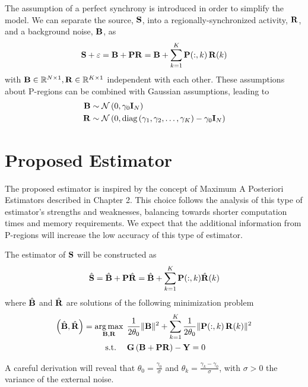 The assumption of a perfect synchrony is introduced in order to simplify the model.
%
We can separate the source, $\mathbf{S}$, into a regionally-synchronized activity, $\mathbf{R}$, and a background noise, $\mathbf{B}$, as
\begin{equation}
    \mathbf{S} +\varepsilon = \mathbf{B} + \mathbf{P} \mathbf{R} = \mathbf{B} + \sum_{k=1}^K \mathbf{P}(:,k)\, \mathbf{R}(k)
    \label{eq:3.4}
\end{equation}
with $\mathbf{B} \in \mathbb{R}^{N\times 1}, \mathbf{R} \in \mathbb{R}^{K\times 1}$ independent with each other.
%
These assumptions about P-regions can be combined with Gaussian assumptions, leading to 
\begin{align}
    \mathbf{B} &\sim \mathcal{N}\left( 0, \gamma_0 \mathbf{I}_N  \right) 
    \label{eq:3.5} \\
    \mathbf{R} &\sim \mathcal{N}\left( 0, \text{diag}\left( \gamma_1, \gamma_2, \dots, \gamma_K \right)-\gamma_0 \mathbf{I}_N  \right)
    \label{eq:3.6}
\end{align}

\section{Proposed Estimator}

The proposed estimator is inspired by the concept of Maximum A Posteriori Estimators described in Chapter 2.
%
This choice follows the analysis of this type of estimator's strengths and weaknesses, balancing towards shorter computation times and memory requirements.
%
We expect that the additional information from P-regions will increase the low accuracy of this type of estimator.

The estimator of $\mathbf{S}$ will be constructed as 
\begin{equation}
    \hat{\mathbf{S}} = \hat{\mathbf{B}} + \mathbf{P} \hat{\mathbf{R}}
    = \hat{\mathbf{B}} + \sum_{k=1}^K \mathbf{P}(:,k) \hat{\mathbf{R}}(k)
    \label{eq:3.7_v2}
\end{equation}
where $\hat{\mathbf{B}}$ and $\hat{\mathbf{R}}$ are solutions of the following minimization problem
\begin{align}
    \left(  \hat{\mathbf{B}}, \hat{\mathbf{R}}  \right) 
    =
    \operatorname*{arg\,max}_{\mathbf{B}, \mathbf{R} }\, 
    &\phantom{.}
    \frac{1}{2 \theta_0} \lVert \mathbf{B} \rVert^2
    +
    \sum_{k=1}^K \frac{1}{2 \theta_0} \lVert \mathbf{P}(:,k)\, \mathbf{R}(k) \rVert^2
    \nonumber \\
    \text{s.t.}
    \quad
    &\phantom{.}
    {\mathbf{G} \left( \mathbf{B} + \mathbf{P} \mathbf{R} \right) } - \mathbf{Y} = 0
    \label{eq:3.7}
\end{align}

A careful derivation will reveal that $\theta_0 = \frac{\gamma_0 }{\sigma}$ and $\theta_k = \frac{\gamma_k-\gamma_0}{\sigma}$, with $\sigma>0$ the variance of the external noise.
%

